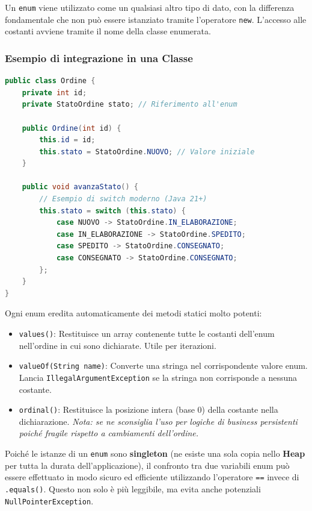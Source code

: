 Un \texttt{enum} viene utilizzato come un qualsiasi altro tipo di dato, con la differenza fondamentale che non può essere istanziato tramite l'operatore \texttt{new}. L'accesso alle costanti avviene tramite il nome della classe enumerata.

\subsubsection*{Esempio di integrazione in una Classe}
\begin{lstlisting}[language=Java, caption={Esempio di utilizzo di un Enum in una classe di business}]
public class Ordine {
    private int id;
    private StatoOrdine stato; // Riferimento all'enum

    public Ordine(int id) {
        this.id = id;
        this.stato = StatoOrdine.NUOVO; // Valore iniziale
    }

    public void avanzaStato() {
        // Esempio di switch moderno (Java 21+)
        this.stato = switch (this.stato) {
            case NUOVO -> StatoOrdine.IN_ELABORAZIONE;
            case IN_ELABORAZIONE -> StatoOrdine.SPEDITO;
            case SPEDITO -> StatoOrdine.CONSEGNATO;
            case CONSEGNATO -> StatoOrdine.CONSEGNATO;
        };
    }
}
\end{lstlisting}

Ogni enum eredita automaticamente dei metodi statici molto potenti:
\begin{itemize}
    \item \texttt{values()}: Restituisce un array contenente tutte le costanti dell'enum nell'ordine in cui sono dichiarate. Utile per iterazioni.
    \item \texttt{valueOf(String name)}: Converte una stringa nel corrispondente valore enum. Lancia \texttt{IllegalArgumentException} se la stringa non corrisponde a nessuna costante.
    \item \texttt{ordinal()}: Restituisce la posizione intera (base 0) della costante nella dichiarazione. \textit{Nota: se ne sconsiglia l'uso per logiche di business persistenti poiché fragile rispetto a cambiamenti dell'ordine.}
\end{itemize}

\begin{observation}
    Poiché le istanze di un \texttt{enum} sono \textbf{singleton} (ne esiste una sola copia nello \textbf{Heap} per tutta la durata dell'applicazione), il confronto tra due variabili enum può essere effettuato in modo sicuro ed efficiente utilizzando l'operatore \texttt{==} invece di \texttt{.equals()}. Questo non solo è più leggibile, ma evita anche potenziali \texttt{NullPointerException}.
\end{observation}


